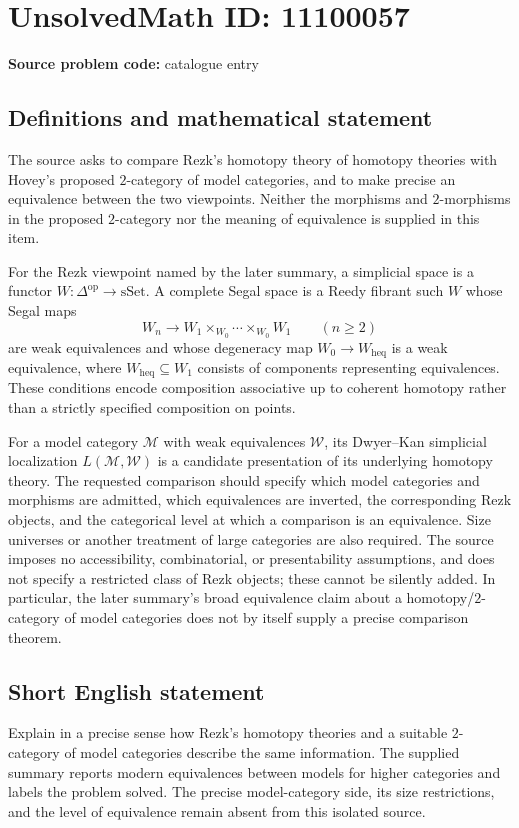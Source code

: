 \documentclass[11pt]{article}
\begin{document}
\section*{UnsolvedMath ID: 11100057}
\textbf{Source problem code:} catalogue entry
\subsection{Definitions and mathematical statement}
The source asks to compare Rezk's homotopy theory of homotopy theories with Hovey's proposed $2$-category of model categories, and to make precise an equivalence between the two viewpoints. Neither the morphisms and $2$-morphisms in the proposed $2$-category nor the meaning of equivalence is supplied in this item.

For the Rezk viewpoint named by the later summary, a simplicial space is a functor $W:\Delta^{\mathrm{op}}\to\mathrm{sSet}$. A complete Segal space is a Reedy fibrant such $W$ whose Segal maps
\[
 W_n\longrightarrow W_1\mathbin{\times}_{W_0}\cdots\mathbin{\times}_{W_0}W_1\qquad(n\geq2)
\]
are weak equivalences and whose degeneracy map $W_0\to W_{\mathrm{heq}}$ is a weak equivalence, where $W_{\mathrm{heq}}\subseteq W_1$ consists of components representing equivalences. These conditions encode composition associative up to coherent homotopy rather than a strictly specified composition on points.

For a model category $\mathcal M$ with weak equivalences $\mathcal W$, its Dwyer--Kan simplicial localization $L(\mathcal M,\mathcal W)$ is a candidate presentation of its underlying homotopy theory. The requested comparison should specify which model categories and morphisms are admitted, which equivalences are inverted, the corresponding Rezk objects, and the categorical level at which a comparison is an equivalence. Size universes or another treatment of large categories are also required. The source imposes no accessibility, combinatorial, or presentability assumptions, and does not specify a restricted class of Rezk objects; these cannot be silently added. In particular, the later summary's broad equivalence claim about a homotopy/$2$-category of model categories does not by itself supply a precise comparison theorem.
\subsection{Short English statement}
Explain in a precise sense how Rezk's homotopy theories and a suitable $2$-category of model categories describe the same information. The supplied summary reports modern equivalences between models for higher categories and labels the problem solved. The precise model-category side, its size restrictions, and the level of equivalence remain absent from this isolated source.
\end{document}
